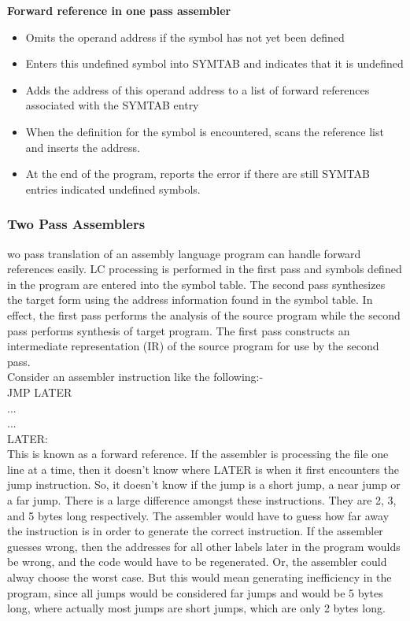 \documentclass[12pt]{article}
\begin{document}
\*
\textbf{Forward reference in one pass assembler}\\
\begin{itemize}
  \item Omits the operand address if the symbol has not yet been defined
  \item Enters this undefined symbol into SYMTAB and indicates that it is undefined \item Adds the address of this operand address to a list of forward references associated with the SYMTAB entry \item When the definition for the symbol is encountered, scans the reference list and inserts the address. \item At the end of the program, reports the error if there are still SYMTAB entries indicated undefined symbols.
\end{itemize}

\subsubsection{Two Pass Assemblers}
wo   pass   translation   of   an   assembly   language   program   can   handle   forward 
references easily. LC processing is performed in the first pass and symbols defined in the 
program  are  entered  into  the  symbol  table.  The  second  pass  synthesizes  the  target  form 
using the address information found in the symbol table. In effect, the first pass performs 
the 
analysis  of  the  source  program  while  the  second  pass  performs  synthesis  of  target 
program.  The  first  pass  constructs  an  intermediate  representation  (IR)  of  the  source 
program for use by the second pass. \\
 Consider an assembler instruction like the following:-\\

          JMP  LATER\\
                 ...\\
                   ...\\
LATER:\\

This is known as a forward reference. If the assembler is processing the file one line at a time, then it doesn't know where LATER is when it first encounters the jump instruction. So, it doesn't know if the jump is a short jump, a near jump or a far jump. There is a large difference amongst these instructions. They are 2, 3, and 5 bytes long respectively. The assembler would have to guess how far away the instruction is in order to generate the correct instruction. If the assembler guesses wrong, then the addresses for all other labels later in the program woulds be wrong, and the code would have to be regenerated. Or, the assembler could alway choose the worst case. But this would mean generating inefficiency in the program, since all jumps would be considered far jumps and would be 5 bytes long, where actually most jumps are short jumps, which are only 2 bytes long.
\end{document}
